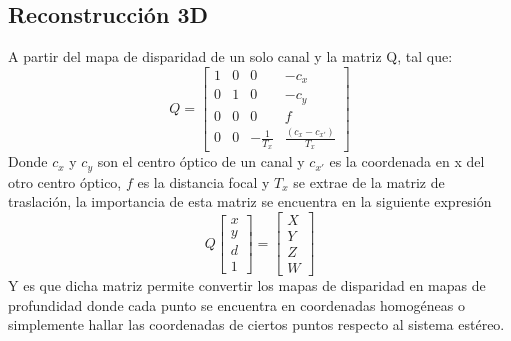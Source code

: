 \subsection{Reconstrucción 3D}
A partir del mapa de disparidad de un solo canal y la matriz Q, tal que:
\begin{equation}
    Q = \begin{bmatrix}
            1 & 0 & 0 & -c_{x}\\
            0 & 1 & 0 & -c_{y}\\
            0 & 0 & 0 & f\\
            0 & 0 & -\frac{1}{T_{x}} & \frac{(c_{x} - c_{x\prime})}{T_{x}}
        \end{bmatrix}
\end{equation}
Donde $c_{x}$ y $c_{y}$ son el centro óptico de un canal y $c_{x\prime}$ es la coordenada en x del otro centro óptico, $f$ es la distancia focal y $T_{x}$ se extrae de la matriz de traslación, la importancia de esta matriz se encuentra en la siguiente expresión
\begin{equation}
    Q\begin{bmatrix}
            x\\
            y\\
            d\\
            1
        \end{bmatrix} = \begin{bmatrix}
            X\\
            Y\\
            Z\\
            W
        \end{bmatrix}
\end{equation}
Y es que dicha matriz permite convertir los mapas de disparidad en mapas de profundidad donde cada punto se encuentra en coordenadas homogéneas o simplemente hallar las coordenadas de ciertos puntos respecto al sistema estéreo.
